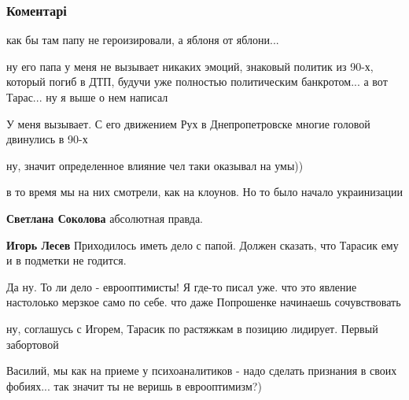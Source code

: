  
 
 
 
 
\subsubsection{Коментарі}

\begin{itemize} %
как бы там папу не героизировали, а яблоня от яблони...

\begin{itemize} %

ну его папа у меня не вызывает никаких эмоций, знаковый политик из 90-х,
который погиб в ДТП, будучи уже полностью политическим банкротом... а вот
Тарас... ну я выше о нем написал

У меня вызывает. С его движением Рух в Днепропетровске многие головой двинулись в 90-х

ну, значит определенное влияние чел таки оказывал на умы))

в то время мы на них смотрели, как на клоунов. Но то было начало украинизации

\textbf{Светлана Соколова} абсолютная правда.

\textbf{Игорь Лесев} Приходилось иметь дело с папой. Должен сказать, что Тарасик ему и в подметки не годится.
\end{itemize} %


Да ну. То ли дело - еврооптимисты! Я где-то писал уже. что это явление
настолоько мерзкое само по себе. что даже Попрошенке начинаешь сочувствовать

\begin{itemize} %
ну, соглашусь с Игорем, Тарасик по растяжкам в позицию лидирует. Первый забортовой

Василий, мы как на приеме у психоаналитиков - надо сделать признания в своих фобиях... так значит ты не веришь в еврооптимизм?)


\end{itemize}
\end{itemize}
